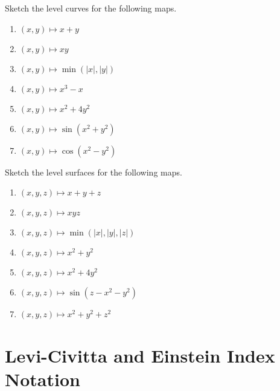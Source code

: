 \section*{}
\begin{multicols}{2}\columnseprule 1pt \columnsep 25pt

\begin{problem}
Sketch the level curves for the following maps.
\begin{enumerate}
\item $(x,y)\mapsto x+y$
\item $(x,y)\mapsto xy$
\item $(x,y)\mapsto \min (|x|,|y|)$
\item $(x,y)\mapsto x^3-x$
\item $(x,y)\mapsto x^2+4y^2$
\item $(x,y)\mapsto \sin (x^2+y^2)$
\item $(x,y)\mapsto \cos (x^2-y^2)$
\end{enumerate}
\end{problem}
\begin{problem}
Sketch the level surfaces for the following maps.
\begin{enumerate}
\item $(x,y,z)\mapsto x+y+z$
\item $(x,y,z)\mapsto xyz$
\item $(x,y,z)\mapsto \min (|x|,|y|, |z|)$
\item $(x,y,z)\mapsto x^2+y^2$
\item $(x,y,z)\mapsto x^2+4y^2$
\item $(x,y,z)\mapsto \sin (z-x^2-y^2)$
\item $(x,y,z)\mapsto x^2+y^2+z^2$
\end{enumerate}
\end{problem}



\end{multicols}


\section{Levi-Civitta and Einstein Index Notation}





